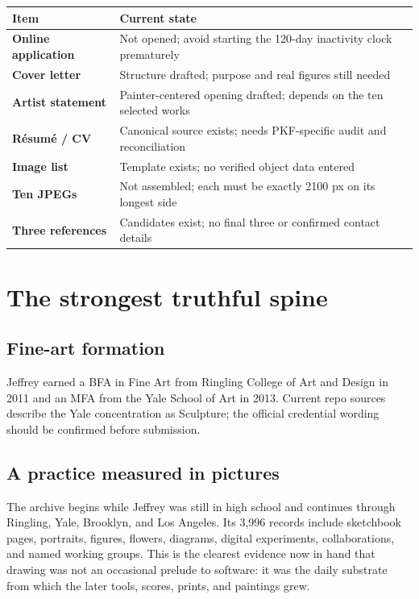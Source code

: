 \documentclass[11pt,letterpaper]{article}
\begin{document}
\begin{tabularx}{\textwidth}{>{\bfseries}p{}X}
\toprule
Item & Current state \\
\midrule
Online application & Not opened; avoid starting the 120-day inactivity clock prematurely \\
Cover letter & Structure drafted; purpose and real figures still needed \\
Artist statement & Painter-centered opening drafted; depends on the ten selected works \\
Résumé / CV & Canonical source exists; needs PKF-specific audit and reconciliation \\
Image list & Template exists; no verified object data entered \\
Ten JPEGs & Not assembled; each must be exactly 2100 px on its longest side \\
Three references & Candidates exist; no final three or confirmed contact details \\
\bottomrule
\end{tabularx}

\section{The strongest truthful spine}

\subsection{Fine-art formation}

Jeffrey earned a BFA in Fine Art from Ringling College of Art and Design in 2011 and an MFA from the Yale School of Art in 2013. Current repo sources describe the Yale concentration as Sculpture; the official credential wording should be confirmed before submission.

\subsection{A practice measured in pictures}

The archive begins while Jeffrey was still in high school and continues through Ringling, Yale, Brooklyn, and Los Angeles. Its 3,996 records include sketchbook pages, portraits, figures, flowers, diagrams, digital experiments, collaborations, and named working groups. This is the clearest evidence now in hand that drawing was not an occasional prelude to software: it was the daily substrate from which the later tools, scores, prints, and paintings grew.
\end{document}
